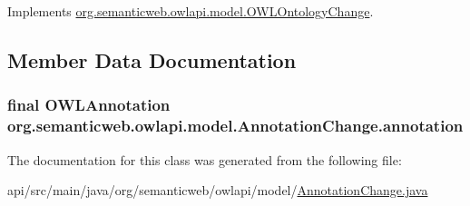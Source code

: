 Implements \hyperlink{classorg_1_1semanticweb_1_1owlapi_1_1model_1_1_o_w_l_ontology_change_aa7fe98a39e1659ee2b16aaa1b6ccd4b9}{org.\-semanticweb.\-owlapi.\-model.\-O\-W\-L\-Ontology\-Change}.



\subsection{Member Data Documentation}
\hypertarget{classorg_1_1semanticweb_1_1owlapi_1_1model_1_1_annotation_change_a82541adcd6969af37b2d2c2663e7f69c}{
\subsubsection[{annotation}]{\setlength{\rightskip}{0pt plus 5cm}final {\bf O\-W\-L\-Annotation} org.\-semanticweb.\-owlapi.\-model.\-Annotation\-Change.\-annotation\hspace{0.3cm}{\ttfamily [private]}}}\label{classorg_1_1semanticweb_1_1owlapi_1_1model_1_1_annotation_change_a82541adcd6969af37b2d2c2663e7f69c}


The documentation for this class was generated from the following file\-:\begin{DoxyCompactItemize}
\item 
api/src/main/java/org/semanticweb/owlapi/model/\hyperlink{_annotation_change_8java}{Annotation\-Change.\-java}\end{DoxyCompactItemize}
